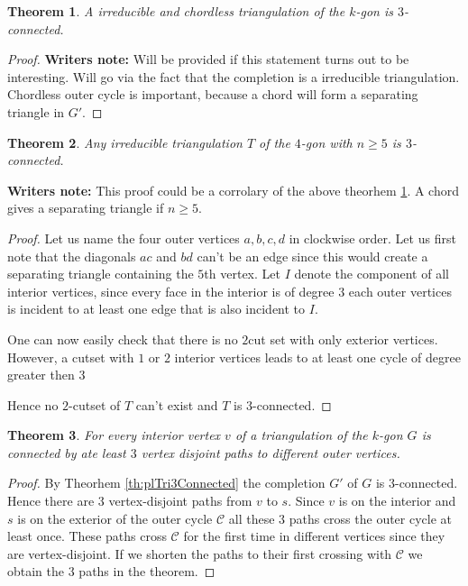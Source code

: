\documentclass[a4paper]{article}
\newtheorem{thrm}{Theorem}
\theoremstyle{definition}
\newcommand{\scr}[1]{\mathcal{#1}}
\newcommand{\C}{\scr C}
\newcommand{\note}{\textbf{Writers note: }}
\begin{document}
\begin{thrm}
\label{th:irreducible and chordless triangulation of the kgon is 3connected}
A irreducible and chordless triangulation of the $k$-gon is $3$-connected.
\end{thrm}
\begin{proof}
\note Will be provided if this statement turns out to be interesting. Will go via the fact that the completion is a irreducible triangulation. Chordless outer cycle is important, because a chord will form a separating triangle in $G'$.
\end{proof}

\begin{thrm}
Any irreducible triangulation $T$ of the $4$-gon with $n \geq 5$ is $3$-connected. 
\end{thrm}

\note This proof could be a corrolary of the above theorhem \ref{th:irreducible and chordless triangulation of the kgon is 3connected}. A chord gives a separating triangle if $n\geq 5$.
\begin{proof} 
Let us name the four outer vertices $a,b,c,d$ in clockwise order. Let us first note that the diagonals $ac$ and $bd$ can't be an edge since this would create a separating triangle containing the $5$th vertex. Let $I$ denote the component of all interior vertices, since every face in the interior is of degree $3$ each outer vertices is incident to at least one edge that is also incident to $I$. %

One can now easily check that there is no $2$cut set with only exterior vertices. However, a cutset with $1$ or $2$ interior vertices leads to at least one cycle of degree greater then $3$ %

Hence no $2$-cutset of $T$ can't exist and $T$ is $3$-connected. 
\end{proof}

\begin{thrm}
For every interior vertex $v$ of a triangulation of the $k$-gon $G$ is connected by ate least $3$ vertex disjoint paths to different outer vertices.
\end{thrm}
\begin{proof}
By Theorhem \ref{th:plTri3Connected} the completion $G'$ of $G$ is $3$-connected. Hence there are 3 vertex-disjoint paths from $v$ to $s$. Since $v$ is on the interior and $s$ is on the exterior of the outer cycle $\C$ all these 3 paths cross the outer cycle at least once. These paths cross $\C$ for the first time in different vertices since they are vertex-disjoint. If we shorten the paths to their first crossing with $\C$ we obtain the $3$ paths in the theorem.
\end{proof}
\end{document}
